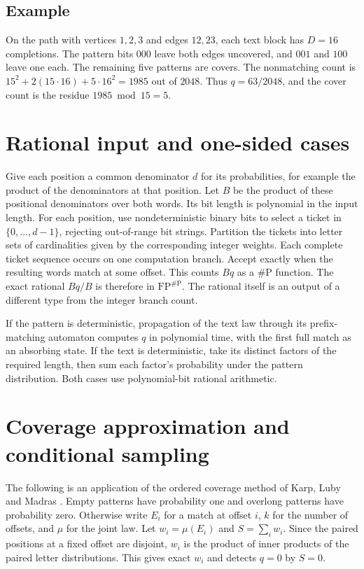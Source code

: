 \documentclass[11pt,a4paper]{amsart}
\newcommand{\sharpP}{\#\mathrm{P}}
\newcommand{\FP}{\mathrm{FP}}
\begin{document}
\subsection*{Example}
On the path with vertices $1,2,3$ and edges $12,23$, each text block has $D=16$ completions. The pattern bits $000$ leave both edges uncovered, and $001$ and $100$ leave one each. The remaining five patterns are covers. The nonmatching count is $15^2+2(15\cdot16)+5\cdot16^2=1985$ out of $2048$. Thus $q=63/2048$, and the cover count is the residue $1985\bmod 15=5$.

\section{Rational input and one-sided cases}
Give each position a common denominator $d$ for its probabilities, for example the product of the denominators at that position. Let $B$ be the product of these positional denominators over both words. Its bit length is polynomial in the input length. For each position, use nondeterministic binary bits to select a ticket in $\{0,\ldots,d-1\}$, rejecting out-of-range bit strings. Partition the tickets into letter sets of cardinalities given by the corresponding integer weights. Each complete ticket sequence occurs on one computation branch. Accept exactly when the resulting words match at some offset. This counts $Bq$ as a $\sharpP$ function. The exact rational $Bq/B$ is therefore in $\FP^{\sharpP}$. The rational itself is an output of a different type from the integer branch count.

If the pattern is deterministic, propagation of the text law through its prefix-matching automaton computes $q$ in polynomial time, with the first full match as an absorbing state. If the text is deterministic, take its distinct factors of the required length, then sum each factor's probability under the pattern distribution. Both cases use polynomial-bit rational arithmetic.

\section{Coverage approximation and conditional sampling}
The following is an application of the ordered coverage method of Karp, Luby and Madras \cite[Sections~3--4]{klm}. Empty patterns have probability one and overlong patterns have probability zero. Otherwise write $E_i$ for a match at offset $i$, $k$ for the number of offsets, and $\mu$ for the joint law. Let $w_i=\mu(E_i)$ and $S=\sum_i w_i$. Since the paired positions at a fixed offset are disjoint, $w_i$ is the product of inner products of the paired letter distributions. This gives exact $w_i$ and detects $q=0$ by $S=0$.
\end{document}
